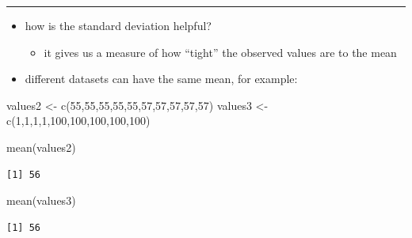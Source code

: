 \documentclass[
  letterpaper,
  DIV=11]{scrartcl}
\newenvironment{Shaded}{\begin{snugshade}}{\end{snugshade}}
\newcommand{\DecValTok}[1]{\textcolor[rgb]{0.68,0.00,0.00}{#1}}
\newcommand{\FunctionTok}[1]{\textcolor[rgb]{0.28,0.35,0.67}{#1}}
\newcommand{\NormalTok}[1]{\textcolor[rgb]{0.00,0.23,0.31}{#1}}
\newcommand{\OtherTok}[1]{\textcolor[rgb]{0.00,0.23,0.31}{#1}}
\providecommand{\tightlist}{%
  \setlength{\itemsep}{0pt}\setlength{\parskip}{0pt}}\usepackage{longtable,booktabs,array}
\begin{document}
\begin{center}\rule{0.5\linewidth}{0.5pt}\end{center}

\begin{itemize}
\tightlist
\item
  how is the standard deviation helpful?

  \begin{itemize}
  \tightlist
  \item
    it gives us a measure of how ``tight'' the observed values are to
    the mean
  \end{itemize}
\item
  different datasets can have the same mean, for example:
\end{itemize}

\begin{Shaded}
\begin{Highlighting}[]
\NormalTok{values2 }\OtherTok{\textless{}{-}} \FunctionTok{c}\NormalTok{(}\DecValTok{55}\NormalTok{,}\DecValTok{55}\NormalTok{,}\DecValTok{55}\NormalTok{,}\DecValTok{55}\NormalTok{,}\DecValTok{55}\NormalTok{,}\DecValTok{57}\NormalTok{,}\DecValTok{57}\NormalTok{,}\DecValTok{57}\NormalTok{,}\DecValTok{57}\NormalTok{,}\DecValTok{57}\NormalTok{)}
\NormalTok{values3 }\OtherTok{\textless{}{-}} \FunctionTok{c}\NormalTok{(}\DecValTok{1}\NormalTok{,}\DecValTok{1}\NormalTok{,}\DecValTok{1}\NormalTok{,}\DecValTok{1}\NormalTok{,}\DecValTok{100}\NormalTok{,}\DecValTok{100}\NormalTok{,}\DecValTok{100}\NormalTok{,}\DecValTok{100}\NormalTok{,}\DecValTok{100}\NormalTok{)}
\end{Highlighting}
\end{Shaded}

\begin{Shaded}
\begin{Highlighting}[]
\FunctionTok{mean}\NormalTok{(values2)}
\end{Highlighting}
\end{Shaded}

\begin{verbatim}
[1] 56
\end{verbatim}

\begin{Shaded}
\begin{Highlighting}[]
\FunctionTok{mean}\NormalTok{(values3)}
\end{Highlighting}
\end{Shaded}

\begin{verbatim}
[1] 56
\end{verbatim}
\end{document}
